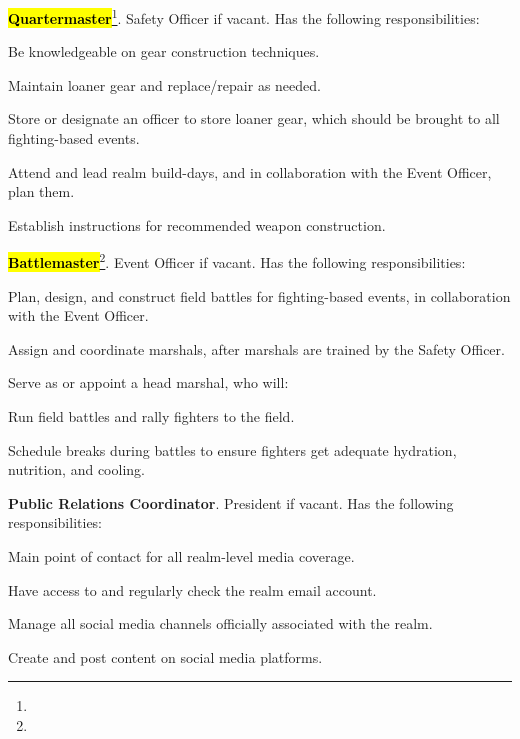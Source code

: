 \documentclass[12pt]{article}
\newcommand{\newpart}[2][]{\hl{#2}\expandafter\ifx\expandafter\relax\detokenize{#1}\relax\else\textnormal{\footnote{#1}}\fi}
\begin{document}
\begin{level}
\begin{level}
\begin{level}
    \end{level}
    \item \newpart{\textbf{Quartermaster}}. Safety Officer if vacant. Has the following responsibilities:
    \begin{level}
        \item Be knowledgeable on gear construction techniques.
        \item Maintain loaner gear and replace/repair as needed.
        \item Store or designate an officer to store loaner gear, which should be brought to all fighting-based events.
        \item Attend and lead realm build-days, and in collaboration with the Event Officer, plan them.
        \item Establish instructions for recommended weapon construction.
    \end{level}
    \item \newpart{\textbf{Battlemaster}}. Event Officer if vacant. Has the following responsibilities:
    \begin{level}
        \item Plan, design, and construct field battles for fighting-based events, in collaboration with the Event Officer.
        \item Assign and coordinate marshals, after marshals are trained by the Safety Officer.
        \item Serve as or appoint a head marshal, who will:
        \begin{level}
            \item Run field battles and rally fighters to the field.
            \item Schedule breaks during battles to ensure fighters get adequate hydration, nutrition, and cooling.
        \end{level}
    \end{level}
    \item \textbf{Public Relations Coordinator}. President if vacant. Has the following responsibilities:
    \begin{level}
        \item Main point of contact for all realm-level media coverage.
        \item Have access to and regularly check the realm email account.
        \item Manage all social media channels officially associated with the realm.
        \item Create and post content on social media platforms.

\end{level}
\end{level}
\end{level}
\end{document}
